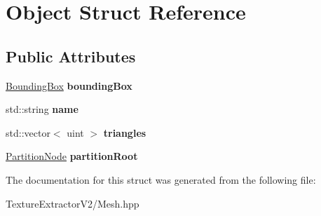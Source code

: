 \hypertarget{struct_object}{}\section{Object Struct Reference}
\label{struct_object}
\subsection*{Public Attributes}
\begin{DoxyCompactItemize}
\item 
\hypertarget{struct_object_aeeac86f3158968433d8484fb43dc9727}{}\hyperlink{struct_bounding_box}{Bounding\+Box} {\bfseries bounding\+Box}\label{struct_object_aeeac86f3158968433d8484fb43dc9727}

\item 
\hypertarget{struct_object_a24457e0a387492c80594aec7681a2277}{}std\+::string {\bfseries name}\label{struct_object_a24457e0a387492c80594aec7681a2277}

\item 
\hypertarget{struct_object_a4a7a34b417ea8969e1407e6962c671eb}{}std\+::vector$<$ uint $>$ {\bfseries triangles}\label{struct_object_a4a7a34b417ea8969e1407e6962c671eb}

\item 
\hypertarget{struct_object_a484e6471a6620c2dd98aa3db6ab7a9f5}{}\hyperlink{struct_partition_node}{Partition\+Node} {\bfseries partition\+Root}\label{struct_object_a484e6471a6620c2dd98aa3db6ab7a9f5}

\end{DoxyCompactItemize}


The documentation for this struct was generated from the following file\+:\begin{DoxyCompactItemize}
\item 
Texture\+Extractor\+V2/Mesh.\+hpp\end{DoxyCompactItemize}
